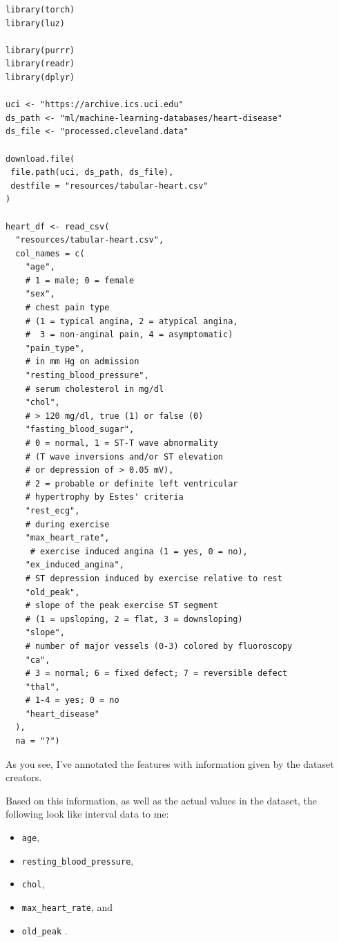 \documentclass[
  letterpaper,
]{krantz}
\begin{document}
\begin{verbatim}
library(torch)
library(luz)

library(purrr)
library(readr)
library(dplyr)

uci <- "https://archive.ics.uci.edu"
ds_path <- "ml/machine-learning-databases/heart-disease"
ds_file <- "processed.cleveland.data"

download.file(
 file.path(uci, ds_path, ds_file),
 destfile = "resources/tabular-heart.csv"
)

heart_df <- read_csv(
  "resources/tabular-heart.csv",
  col_names = c(
    "age", 
    # 1 = male; 0 = female
    "sex", 
    # chest pain type
    # (1 = typical angina, 2 = atypical angina,
    #  3 = non-anginal pain, 4 = asymptomatic)
    "pain_type", 
    # in mm Hg on admission
    "resting_blood_pressure", 
    # serum cholesterol in mg/dl
    "chol", 
    # > 120 mg/dl, true (1) or false (0)
    "fasting_blood_sugar", 
    # 0 = normal, 1 = ST-T wave abnormality
    # (T wave inversions and/or ST elevation
    # or depression of > 0.05 mV),
    # 2 = probable or definite left ventricular
    # hypertrophy by Estes' criteria
    "rest_ecg", 
    # during exercise
    "max_heart_rate", 
     # exercise induced angina (1 = yes, 0 = no),
    "ex_induced_angina",
    # ST depression induced by exercise relative to rest 
    "old_peak", 
    # slope of the peak exercise ST segment
    # (1 = upsloping, 2 = flat, 3 = downsloping) 
    "slope", 
    # number of major vessels (0-3) colored by fluoroscopy
    "ca", 
    # 3 = normal; 6 = fixed defect; 7 = reversible defect
    "thal", 
    # 1-4 = yes; 0 = no
    "heart_disease" 
  ),
  na = "?")
\end{verbatim}

As you see, I've annotated the features with information given by the
dataset creators.

Based on this information, as well as the actual values in the dataset,
the following look like interval data to me:

\begin{itemize}
\item
  \texttt{age},
\item
  \texttt{resting\_blood\_pressure},
\item
  \texttt{chol},
\item
  \texttt{max\_heart\_rate}, and
\item
  \texttt{old\_peak} .
\end{itemize}
\end{document}
